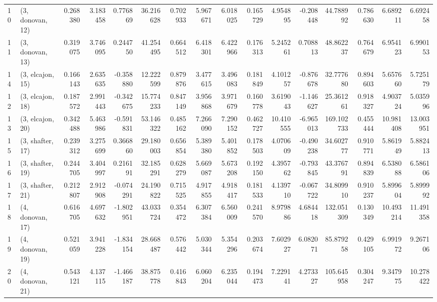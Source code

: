 \begin{tabular}{llrrrrrrrrrrrrrr}
10 &  (3, donovan, 12) &   0.268380 &  3.183458 &  0.776869 &  36.216628 &  0.702933 &   5.967671 &  6.018025 &  0.165729 &   4.954895 & -0.208448 &   44.788992 &  0.786630 &   6.689211 &   6.692458 \\
11 &  (3, donovan, 13) &   0.319075 &  3.746095 &  0.244750 &  41.254495 &  0.664512 &   6.418301 &  6.422966 &  0.176313 &   5.245261 &  0.708813 &   48.862237 &  0.764679 &   6.954123 &   6.990153 \\
14 &  (3, elcajon, 15) &   0.166143 &  2.635635 & -0.358880 &  12.222599 &  0.879876 &   3.477615 &  3.496083 &  0.181849 &   4.101257 & -0.876678 &   32.777680 &  0.894603 &   5.657660 &   5.725179 \\
12 &  (3, elcajon, 18) &   0.187572 &  2.991443 & -0.342675 &  15.774233 &  0.847149 &   3.956868 &  3.971679 &  0.160778 &   3.619043 & -1.146627 &   25.361261 &  0.918327 &   4.903724 &   5.035996 \\
13 &  (3, elcajon, 20) &   0.342488 &  5.463986 & -0.591831 &  53.146322 &  0.485162 &   7.266090 &  7.290152 &  0.462727 &  10.410555 & -6.965013 &  169.102733 &  0.455444 &  10.981408 &  13.003951 \\
15 &  (3, shafter, 17) &   0.239312 &  3.275699 &  0.366860 &  29.180003 &  0.656854 &   5.389380 &  5.401852 &  0.178503 &   4.070609 & -0.490238 &   34.602777 &  0.910771 &   5.861949 &   5.882413 \\
16 &  (3, shafter, 19) &   0.244705 &  3.404997 &  0.216191 &  32.185291 &  0.628279 &   5.669087 &  5.673208 &  0.192150 &   4.395762 & -0.793845 &   43.376791 &  0.894839 &   6.538088 &   6.586106 \\
17 &  (3, shafter, 21) &   0.212807 &  2.912908 & -0.074291 &  24.190822 &  0.715525 &   4.917855 &  4.918417 &  0.181533 &   4.139710 & -0.067722 &   34.809910 &  0.910237 &   5.899604 &   5.899992 \\
18 &  (4, donovan, 17) &   0.616705 &  4.697632 & -1.802951 &  43.033724 &  0.354472 &   6.307384 &  6.560009 &  0.241570 &   8.979886 &  4.684418 &  132.051309 &  0.130349 &  10.493214 &  11.491358 \\
19 &  (4, donovan, 19) &   0.521059 &  3.941228 & -1.834154 &  28.668487 &  0.576442 &   5.030344 &  5.354296 &  0.203674 &   7.602927 &  6.082071 &   85.879258 &  0.429105 &   6.991972 &   9.267106 \\
20 &  (4, donovan, 21) &   0.543121 &  4.137115 & -1.466187 &  38.875778 &  0.416843 &   6.060204 &  6.235044 &  0.194473 &   7.229141 &  4.273327 &  105.645958 &  0.304247 &   9.347975 &  10.278422 \\

\end{tabular}
